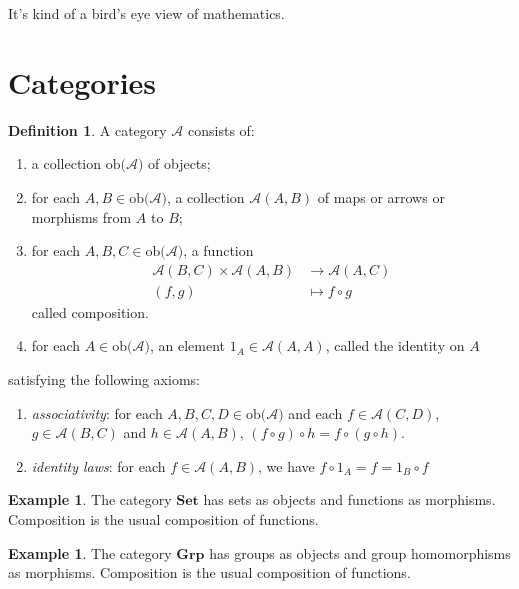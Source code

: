 \documentclass{article}
\theoremstyle{definition}
\newtheorem{definition}[theorem]{Definition}
\newtheorem{example}[theorem]{Example}
\newcommand{\cat}[1]{\mathscr{#1}}
\newcommand{\catobj}[1]{\text{ob(}\cat{#1}\text{)}}
\newcommand{\catmor}[3]{\cat{#1}(#2, #3)}
\begin{document}
It's kind of a bird's eye view of mathematics.

\section{Categories}

\begin{definition}
    A category $\cat{A}$ consists of:

    \begin{enumerate}
        \item a collection $\catobj{A}$ of objects;
        \item for each $A, B \in \catobj{A}$, a collection $\catmor{A}{A}{B}$ of maps or arrows or morphisms from $A$ to $B$;
        \item for each $A, B, C \in \catobj{A}$, a function
              \begin{align*}
                  \catmor{A}{B}{C} \times \catmor{A}{A}{B} & \to \catmor{A}{A}{C} \\
                  (f, g)                                   & \mapsto f \circ g
              \end{align*}
              called composition.
        \item for each $A \in \catobj{A}$, an element $1_A \in \catmor{A}{A}{A}$, called the identity on $A$
    \end{enumerate}
    satisfying the following axioms:
    \begin{enumerate}
        \item \emph{associativity}: for each $A, B, C, D \in \catobj{A}$ and each $f \in \catmor{A}{C}{D}$, $g \in \catmor{A}{B}{C}$ and $h \in \catmor{A}{A}{B}$, $(f \circ g) \circ h = f \circ (g \circ h)$.
        \item \emph{identity laws}: for each $f \in \catmor{A}{A}{B}$, we have $f \circ 1_A = f = 1_B \circ f$
    \end{enumerate}
\end{definition}

\begin{example}
    The category $\textbf{Set}$ has sets as objects and functions as morphisms. Composition is the usual composition of functions.
\end{example}

\begin{example}
    The category $\textbf{Grp}$ has groups as objects and group homomorphisms as morphisms. Composition is the usual composition of functions.
\end{example}
\end{document}
